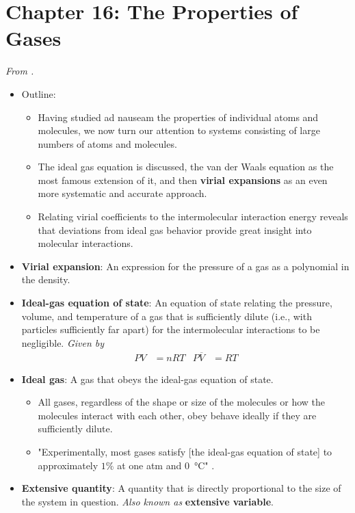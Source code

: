 \documentclass[../notes.tex]{subfiles}
\begin{document}
\section{Chapter 16: The Properties of Gases}
\emph{From \textcite{bib:McQuarrieSimon}.}
\begin{itemize}
    \item {}Outline:
    \begin{itemize}
        \item Having studied ad nauseam the properties of individual atoms and molecules, we now turn our attention to systems consisting of large numbers of atoms and molecules.
        \item The ideal gas equation is discussed, the van der Waals equation as the most famous extension of it, and then \textbf{virial expansions} as an even more systematic and accurate approach.
        \item Relating virial coefficients to the intermolecular interaction energy reveals that deviations from ideal gas behavior provide great insight into molecular interactions.
    \end{itemize}
    \item \textbf{Virial expansion}: An expression for the pressure of a gas as a polynomial in the density.
    \item \textbf{Ideal-gas equation of state}: An equation of state relating the pressure, volume, and temperature of a gas that is sufficiently dilute (i.e., with particles sufficiently far apart) for the intermolecular interactions to be negligible. \emph{Given by}
    \begin{align*}
        PV &= nRT&
        P\overline{V} &= RT
    \end{align*}
    \item \textbf{Ideal gas}: A gas that obeys the ideal-gas equation of state.
    \begin{itemize}
        \item All gases, regardless of the shape or size of the molecules or how the molecules interact with each other, obey behave ideally if they are sufficiently dilute.
        \item "Experimentally, most gases satisfy [the ideal-gas equation of state] to approximately $1\%$ at one atm and \SI{0}{\celsius}" \parencite[638]{bib:McQuarrieSimon}.
    \end{itemize}
    \item \textbf{Extensive quantity}: A quantity that is directly proportional to the size of the system in question. \emph{Also known as} \textbf{extensive variable}.

\end{itemize}
\end{document}
